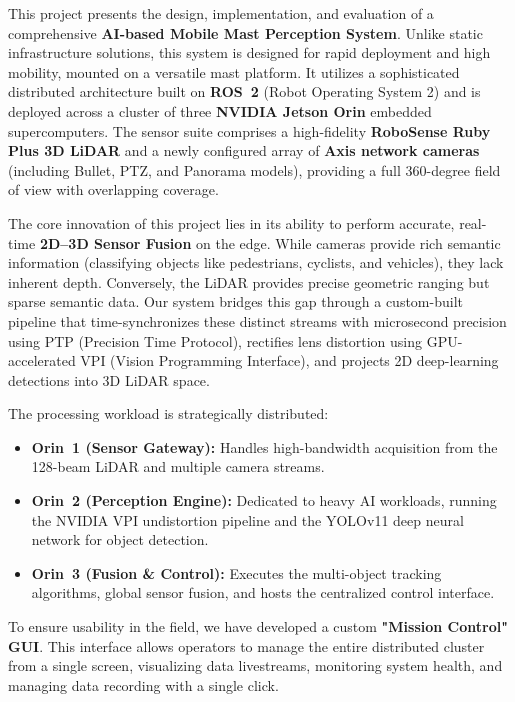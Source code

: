 \documentclass[12pt,a4paper]{report}
\begin{document}
This project presents the design, implementation, and evaluation of a comprehensive \textbf{AI-based Mobile Mast Perception System}. Unlike static infrastructure solutions, this system is designed for rapid deployment and high mobility, mounted on a versatile mast platform. It utilizes a sophisticated distributed architecture built on \textbf{ROS~2} (Robot Operating System 2) and is deployed across a cluster of three \textbf{NVIDIA Jetson Orin} embedded supercomputers. The sensor suite comprises a high-fidelity \textbf{RoboSense Ruby Plus 3D LiDAR} and a newly configured array of \textbf{Axis network cameras} (including Bullet, PTZ, and Panorama models), providing a full 360-degree field of view with overlapping coverage.

The core innovation of this project lies in its ability to perform accurate, real-time \textbf{2D--3D Sensor Fusion} on the edge. While cameras provide rich semantic information (classifying objects like pedestrians, cyclists, and vehicles), they lack inherent depth. Conversely, the LiDAR provides precise geometric ranging but sparse semantic data. Our system bridges this gap through a custom-built pipeline that time-synchronizes these distinct streams with microsecond precision using PTP (Precision Time Protocol), rectifies lens distortion using GPU-accelerated VPI (Vision Programming Interface), and projects 2D deep-learning detections into 3D LiDAR space.

The processing workload is strategically distributed:
\begin{itemize}
    \item \textbf{Orin~1 (Sensor Gateway):} Handles high-bandwidth acquisition from the 128-beam LiDAR and multiple camera streams.
    \item \textbf{Orin~2 (Perception Engine):} Dedicated to heavy AI workloads, running the NVIDIA VPI undistortion pipeline and the YOLOv11 deep neural network for object detection.
    \item \textbf{Orin~3 (Fusion \& Control):} Executes the multi-object tracking algorithms, global sensor fusion, and hosts the centralized control interface.
\end{itemize}

To ensure usability in the field, we have developed a custom \textbf{"Mission Control" GUI}. This interface allows operators to manage the entire distributed cluster from a single screen, visualizing data livestreams, monitoring system health, and managing data recording with a single click.
\end{document}
